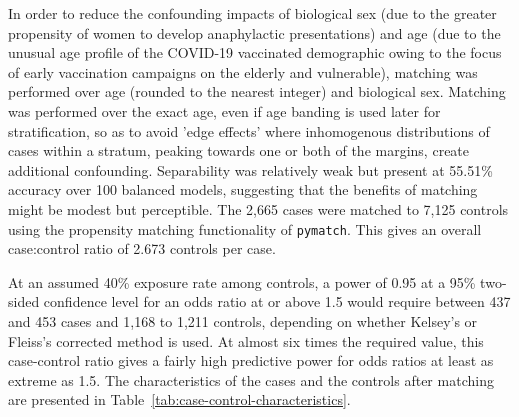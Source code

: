 \documentclass{article}
\begin{document}
In order to reduce the confounding impacts of biological sex (due to the greater propensity of women to develop anaphylactic presentations) and age (due to the unusual age profile of the COVID-19 vaccinated demographic owing to the focus of early vaccination campaigns on the elderly and vulnerable), matching was performed over age (rounded to the nearest integer) and biological sex.
Matching was performed over the exact age, even if age banding is used later for stratification, so as to avoid 'edge effects' where inhomogenous distributions of cases within a stratum, peaking towards one or both of the margins, create additional confounding.
Separability was relatively weak but present at 55.51\% accuracy over 100 balanced models, suggesting that the benefits of matching might be modest but perceptible.
The 2,665 cases were matched to 7,125 controls using the propensity matching functionality of \texttt{pymatch}.
This gives an overall case:control ratio of 2.673 controls per case.

At an assumed 40\% exposure rate among controls, a power of 0.95 at a 95\% two-sided confidence level for an odds ratio at or above 1.5 would require between 437 and 453 cases and 1,168 to 1,211 controls, depending on whether Kelsey's or Fleiss's corrected method is used.\cite{kelsey1996methods,fleiss2013statistical}
At almost six times the required value, this case-control ratio gives a fairly high predictive power for odds ratios at least as extreme as 1.5.
The characteristics of the cases and the controls after matching are presented in Table~\ref{tab:case-control-characteristics}.
\end{document}
